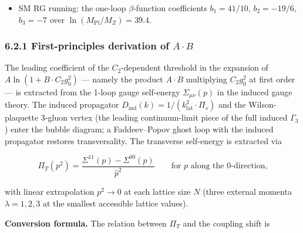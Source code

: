 \documentclass[
]{article}
\begin{document}
\begin{itemize}
  the resummed gauge self-energy contribution. The logarithmic form is
  motivated by geometric-series resummation of the gauge self-energy
  \(1/(1 - \Sigma)\) in the induced gauge theory; the effective exponent
  \(p \approx 0.42\) at the OI coupling is the local slope of the
  logarithm at \(C_2 g_0^2 \sim 1.3\), not a fundamental constant. In
  the current formulation, \(A\) and \(B\) are determined by matching to
  the observed SU(2) and SU(3) couplings at \(M_Z\), given the
  structurally computed \(1/\alpha_0\) and the empirically fixed
  \(\delta_0\). The leading coefficient \(A \cdot B\) is independently
  derived from 2-loop lattice perturbation theory in the induced gauge
  theory (§6.2.1), giving \(A \cdot B = 48.0 \pm 1.5\) against the
  fitted \(46.4\).
\item
  SM RG running: the one-loop \(\beta\)-function coefficients
  \(b_1 = 41/10\), \(b_2 = -19/6\), \(b_3 = -7\) over
  \(\ln(M_{\text{Pl}}/M_Z) = 39.4\).
\end{itemize}

\hypertarget{first-principles-derivation-of-a-cdot-b}{%
\subsubsection{\texorpdfstring{6.2.1 First-principles derivation of
\(A \cdot B\)}{6.2.1 First-principles derivation of A \textbackslash cdot B}}\label{first-principles-derivation-of-a-cdot-b}}

The leading coefficient of the \(C_2\)-dependent threshold in the
expansion of \(A \ln(1 + B \cdot C_2 g_0^2)\) --- namely the product
\(A \cdot B\) multiplying \(C_2 g_0^2\) at first order --- is extracted
from the 1-loop gauge self-energy \(\Sigma_{\mu\nu}(p)\) in the induced
gauge theory. The induced propagator
\(D_{\text{ind}}(k) = 1/(k^2_{\text{lat}} \cdot \Pi_s)\) and the
Wilson-plaquette 3-gluon vertex (the leading continuum-limit piece of
the full induced \(\Gamma_3\)) enter the bubble diagram; a
Faddeev--Popov ghost loop with the induced propagator restores
transversality. The transverse self-energy is extracted via

\[\Pi_T(p^2) = \frac{\Sigma^{11}(p) - \Sigma^{00}(p)}{\hat{p}^2} \qquad \text{for } p \text{ along the 0-direction,}\]

with linear extrapolation \(p^2 \to 0\) at each lattice size \(N\)
(three external momenta \(\lambda = 1, 2, 3\) at the smallest accessible
lattice values).

\textbf{Conversion formula.} The relation between \(\Pi_T\) and the
coupling shift is
\end{document}
